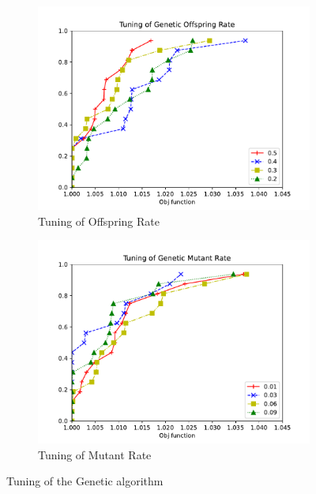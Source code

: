 
\begin{figure}[!h]
    \centering
        \begin{subfigure}{0.48\textwidth} %
            \includegraphics[scale=0.45]{images/genoff.pdf} 
            \caption{Tuning of Offspring Rate}
            \label{fig:genoff}
        \end{subfigure}
        \begin{subfigure}{0.48\textwidth}
            \includegraphics[scale=0.45]{images/genmut.pdf}
            \caption{Tuning of Mutant Rate}
            \label{fig:genmut}
        \end{subfigure}
    \caption{Tuning of the Genetic algorithm}
    \end{figure}

